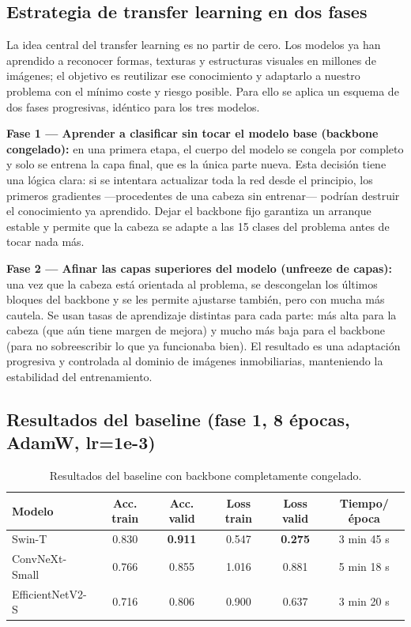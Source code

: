 \subsection{Estrategia de transfer learning en dos fases}

La idea central del transfer learning es no partir de cero. Los modelos ya han aprendido a reconocer formas, texturas y estructuras visuales en millones de imágenes; el objetivo es reutilizar ese conocimiento y adaptarlo a nuestro problema con el mínimo coste y riesgo posible. Para ello se aplica un esquema de dos fases progresivas, idéntico para los tres modelos.

\textbf{Fase 1 — Aprender a clasificar sin tocar el modelo base (backbone congelado):} en una primera etapa, el cuerpo del modelo se congela por completo y solo se entrena la capa final, que es la única parte nueva. Esta decisión tiene una lógica clara: si se intentara actualizar toda la red desde el principio, los primeros gradientes —procedentes de una cabeza sin entrenar— podrían destruir el conocimiento ya aprendido. Dejar el backbone fijo garantiza un arranque estable y permite que la cabeza se adapte a las 15 clases del problema antes de tocar nada más.

\textbf{Fase 2 — Afinar las capas superiores del modelo (unfreeze de capas):} una vez que la cabeza está orientada al problema, se descongelan los últimos bloques del backbone y se les permite ajustarse también, pero con mucha más cautela. Se usan tasas de aprendizaje distintas para cada parte: más alta para la cabeza (que aún tiene margen de mejora) y mucho más baja para el backbone (para no sobreescribir lo que ya funcionaba bien). El resultado es una adaptación progresiva y controlada al dominio de imágenes inmobiliarias, manteniendo la estabilidad del entrenamiento.

\subsection{Resultados del baseline (fase 1, 8 épocas, AdamW, lr=1e-3)}

\begin{table}[H]
    \centering
    \caption{Resultados del baseline con backbone completamente congelado.}
    \label{tab:baseline-modelos}
    \begin{tabular}{lccccc}
        \toprule
        Modelo & Acc. train & Acc. valid & Loss train & Loss valid & Tiempo/época \\
        \midrule
        Swin-T           & 0.830 & \textbf{0.911} & 0.547 & \textbf{0.275} & 3 min 45 s \\
        ConvNeXt-Small   & 0.766 & 0.855          & 1.016 & 0.881          & 5 min 18 s \\
        EfficientNetV2-S & 0.716 & 0.806          & 0.900 & 0.637          & 3 min 20 s \\
        \bottomrule
    \end{tabular}
\end{table}

